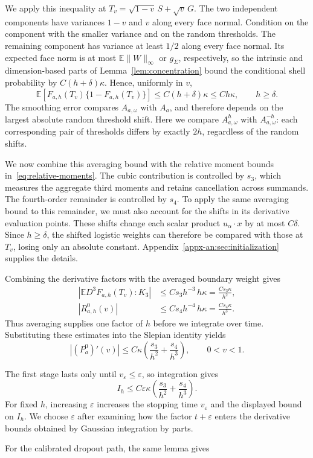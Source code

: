 \documentclass[11pt,letterpaper,twoside,leqno]{article}
\theoremstyle{bookplain}
\theoremstyle{bookremark}
\newcommand{\E}{\mathbb E}
\begin{document}
{{{We apply this inequality at \(T_v=\sqrt{1-v}\,S+\sqrt v\,G\).
The two independent components have variances \(1-v\) and \(v\)
along every face normal. Condition on the component with the smaller
variance and on the random thresholds. The remaining component has
variance at least \(1/2\) along every face normal. {Its expected face norm is at most
\(\E\|W\|_\infty\) or \(g_\Sigma\), respectively, so the intrinsic
and dimension-based parts of Lemma~\ref{lem:concentration}} bound the conditional shell probability
by \(C(h+\delta){\kappa}\). Hence, uniformly in \(v\),
\[
 \E[F_{a,h}(T_v)\{1-F_{a,h}(T_v)\}]
 \le C(h+\delta){\kappa}\le Ch{\kappa},
 \qquad {h\ge\delta}.
\]
The smoothing error compares \(A_{a,\omega}\) with \(A_a\), and
therefore depends on the largest absolute random threshold shift.
Here we compare \(A_{a,\omega}^{h}\) with \(A_{a,\omega}^{-h}\):
each corresponding pair of thresholds differs by exactly \(2h\),
regardless of the random shifts.
}

We now combine this averaging bound with the relative moment bounds
in~\eqref{eq:relative-moments}. The cubic contribution is controlled by
\(s_3\), which measures the aggregate third moments and retains
cancellation across summands. The fourth-order remainder is controlled
by \(s_4\). To apply the same averaging bound to this remainder, we must
also account for the shifts in its derivative evaluation points.
These shifts change each scalar product \(u_\alpha\cdot x\) by at most
\(C\delta\). {Since \(h\ge\delta\)}, the shifted logistic weights
can therefore be compared with those at \(T_v\), losing only an
absolute constant. Appendix~\ref{appx-an:sec:initialization} supplies the details.
}

Combining the derivative factors with the averaged boundary weight
gives
\[
\begin{aligned}
 \left|\E D^3F_{a,h}(T_v):K_3\right|
 &\le Cs_3h^{-3}\,h{\kappa}
 =\frac{Cs_3{\kappa}}{h^2},\\
 |R^0_{a,h}(v)|
 &\le Cs_4h^{-4}\,h{\kappa}
 =\frac{Cs_4{\kappa}}{h^3}.
\end{aligned}
\]
Thus averaging supplies one factor of \(h\) before we integrate over
time. Substituting these estimates into the Slepian identity yields
\[
 |(P_a^0)'(v)|
 \le C{\kappa}\left(\frac{s_3}{h^2}+\frac{s_4}{h^3}\right),
 \qquad 0<v<1.
\]

{
The first stage lasts only until \(v_\varepsilon\le\varepsilon\),
so integration gives
\[
 I_h\le C\varepsilon{\kappa}
       \left(\frac{s_3}{h^2}+\frac{s_4}{h^3}\right).
\]
For fixed \(h\), increasing \(\varepsilon\) increases the stopping
time \(v_\varepsilon\) and the displayed bound on \(I_h\). We choose
\(\varepsilon\) after examining how the factor \(t+\varepsilon\)
enters the derivative bounds obtained by Gaussian integration by parts.
}

For the calibrated dropout path, the same lemma gives}
\end{document}
